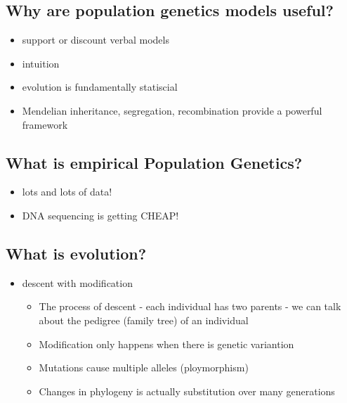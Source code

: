 \documentclass{article}
\begin{document}
        \subsection{Why are population genetics models useful?}
            \begin{itemize}
                \item support or discount verbal models
                \item intuition
                \item evolution is fundamentally statiscial
                \item Mendelian inheritance, segregation, recombination provide a powerful framework
            \end{itemize}

        \subsection{What is empirical Population Genetics?}
            \begin{itemize}
                \item lots and lots of data!
                \item DNA sequencing is getting CHEAP!
            \end{itemize}

        \subsection{What is evolution?}
            \begin{itemize}
                \item descent with modification
                \begin{itemize}
                    \item The process of descent - each individual has two parents - we can talk about the pedigree (family tree) of an individual
                    \item Modification only happens when there is genetic variantion
                    \item Mutations cause multiple alleles (ploymorphism)
                    \item Changes in phylogeny is actually substitution over many generations
                \end{itemize}
            \end{itemize}
\end{document}
